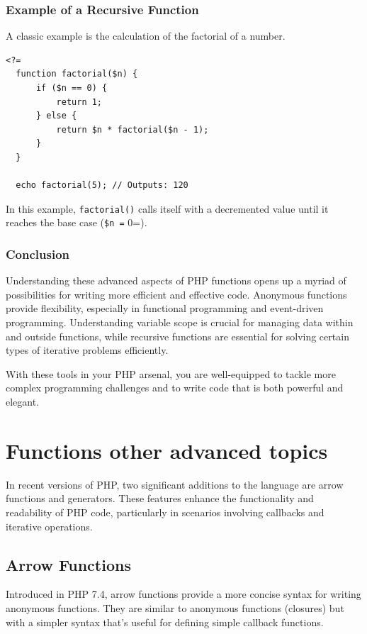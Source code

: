 \documentclass[11pt]{article}
\begin{document}
\subsubsection{Example of a Recursive Function}
\label{sec:org4b081ce}
A classic example is the calculation of the factorial of a number.

\begin{verbatim}
<?=
  function factorial($n) {
      if ($n == 0) {
          return 1;
      } else {
          return $n * factorial($n - 1);
      }
  }

  echo factorial(5); // Outputs: 120
\end{verbatim}

In this example, \texttt{factorial()} calls itself with a decremented value
until it reaches the base case (\texttt{\$n =} 0=).

\subsubsection{Conclusion}
\label{sec:org3556437}
Understanding these advanced aspects of PHP functions opens up a myriad
of possibilities for writing more efficient and effective code.
Anonymous functions provide flexibility, especially in functional
programming and event-driven programming. Understanding variable scope
is crucial for managing data within and outside functions, while
recursive functions are essential for solving certain types of iterative
problems efficiently.

With these tools in your PHP arsenal, you are well-equipped to tackle
more complex programming challenges and to write code that is both
powerful and elegant.

\section{Functions other advanced topics}
\label{sec:org4442172}
In recent versions of PHP, two significant additions to the language are
arrow functions and generators. These features enhance the functionality
and readability of PHP code, particularly in scenarios involving
callbacks and iterative operations.

\subsection{Arrow Functions}
\label{sec:org804841e}
Introduced in PHP 7.4, arrow functions provide a more concise syntax for
writing anonymous functions. They are similar to anonymous functions
(closures) but with a simpler syntax that's useful for defining simple
callback functions.
\end{document}
